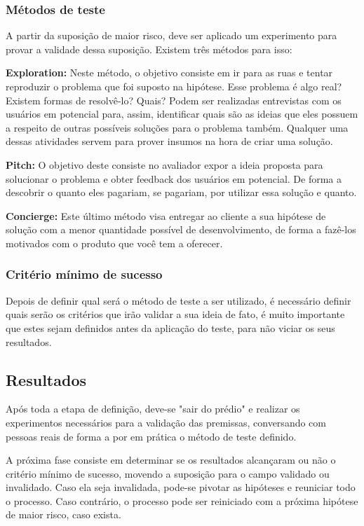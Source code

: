 \subsubsection {Métodos de teste}

A partir da suposição de maior risco, deve ser aplicado um experimento para provar a validade dessa suposição. Existem três métodos para isso:

\textbf{Exploration:} Neste método, o objetivo consiste em ir para as ruas e tentar reproduzir o problema que foi suposto na hipótese. Esse problema é algo real? Existem formas de resolvê-lo? Quais? Podem ser realizadas entrevistas com os usuários em potencial para, assim, identificar quais são as ideias que eles possuem a respeito de outras possíveis soluções para o problema também. Qualquer uma dessas atividades servem para prover insumos na hora de criar uma solução.

\textbf{Pitch:} O objetivo deste consiste no avaliador expor a ideia proposta para solucionar o problema e obter feedback dos usuários em potencial. De forma a descobrir o quanto eles pagariam, se pagariam, por utilizar essa solução e quanto.

\textbf{Concierge:} Este último método visa entregar ao cliente a sua hipótese de solução com a menor quantidade possível de desenvolvimento, de forma a fazê-los motivados com o produto que você tem a oferecer.

\subsubsection {Critério mínimo de sucesso}
Depois de definir qual será o método de teste a ser utilizado, é necessário definir quais serão os critérios que irão validar a sua ideia de fato, é muito importante que estes sejam definidos antes da aplicação do teste, para não viciar os seus resultados.

\subsection {Resultados}
Após toda a etapa de definição, deve-se "sair do prédio"  e realizar os experimentos necessários para a validação das premissas, conversando com pessoas reais de forma a por em prática o método de teste definido. 

A próxima fase consiste em determinar se os resultados alcançaram ou não o critério mínimo de sucesso, movendo a suposição para o campo validado ou invalidado. Caso ela seja invalidada, pode-se pivotar as hipóteses e reuniciar todo o processo. Caso contrário, o processo pode ser reiniciado com a próxima hipótese de maior risco, caso exista.

